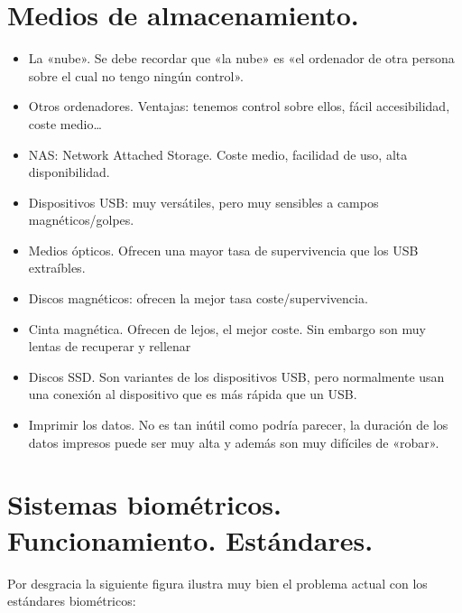 \documentclass[letterpaper,10pt,spanish]{sphinxmanual}
\begin{document}
\section{Medios de almacenamiento.}
\label{\detokenize{tema_pautas_seguridad_informatica/tema_pautas_seguridad_informatica:medios-de-almacenamiento}}\begin{itemize}
\item {} 
La «nube». Se debe recordar que «la nube» es «el ordenador de otra persona sobre el cual no tengo ningún control».

\item {} 
Otros ordenadores. Ventajas: tenemos control sobre ellos, fácil accesibilidad, coste medio…

\item {} 
NAS: Network Attached Storage. Coste medio, facilidad de uso, alta disponibilidad.

\item {} 
Dispositivos USB: muy versátiles, pero muy sensibles a campos magnéticos/golpes.

\item {} 
Medios ópticos. Ofrecen una mayor tasa de supervivencia que los USB extraíbles.

\item {} 
Discos magnéticos: ofrecen la mejor tasa coste/supervivencia.

\item {} 
Cinta magnética. Ofrecen de lejos, el mejor coste. Sin embargo son muy lentas de recuperar y rellenar

\item {} 
Discos SSD. Son variantes de los dispositivos USB, pero normalmente usan una conexión al dispositivo que es más rápida que un USB.

\item {} 
Imprimir los datos. No es tan inútil como podría parecer, la duración de los datos impresos puede ser muy alta y además son muy difíciles de «robar».

\end{itemize}


\section{Sistemas biométricos. Funcionamiento. Estándares.}
\label{\detokenize{tema_pautas_seguridad_informatica/tema_pautas_seguridad_informatica:sistemas-biometricos-funcionamiento-estandares}}
Por desgracia la siguiente figura ilustra muy bien el problema actual con los estándares biométricos:
\end{document}
